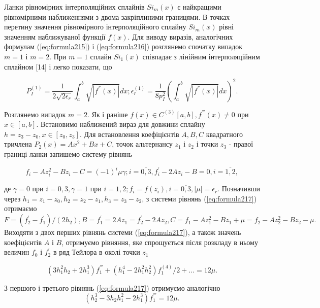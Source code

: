 \documentclass[ukrainian,14pt]{extarticle}
\begin{document}
Ланки рівномірних інтерполяційних сплайнів $Si_m(x)$ є найкращими рівномірними наближеннями з двома закріплиними границями. В точках перетину значення рівномірного інтерполяційного сплайну $Si_m(x)$ рівні значенням наближуваної функції $f(x)$. Для виводу виразів, аналогічних формулам (\ref{eq:formula215}) і (\ref{eq:formula216}) розглянемо спочатку випадок $m = 1$ і $m = 2$. При $m = 1$ сплайн $Si_1(x)$ співпадає з лінійним інтерполяційним сплайном [14] і легко показати, що

$$P^{(1)}_I = \frac{1}{2\sqrt{2\epsilon_r}} \int_a^b \sqrt{|f^{''}(x)|}dx; \epsilon^{(1)}_r = \frac{1}{8p_{I}^2} \left(\int_a^b \sqrt{|f^{''}(x)|}dx \right)^2.$$

Розглянемо випадок $m = 2$. Як і раніше $f(x) \in C^{(3)} [a, b], f^{'''}(x) \neq 0$ при $x \in [a, b]$. Встановимо наближений вираз для довжини сплайну $h  = z_3 - z_0, x \in [z_0, z_3].$ Для встановлення коефіцієнтів $A, B, C$ квадратного тричлена $P_2(x) = Ax^2 + Bx + C$, точок альтернансу $z_1$ і $z_2$ і точки $z_3$ - правої границі ланки запишемо систему рівнянь

\begin{equation}\label{eq:formula217}
    f_i - Az_i^2 - Bz_i - C = (-1)^i \mu \gamma; i = \overline{0, 3}, f^'_i - 2Az_i - B = 0, i = \overline{1,2},
\end{equation}

де $\gamma = 0$ при $i = 0, 3, \gamma = 1$ при $i = 1,2; f_i = f(z_i), i = \overline{0, 3}, |\mu| = \epsilon_r$. Позначивши через $h_1 = z_1 - z_0, h_2 = z_2 - z_1, h_3 = z_3 - z_2$, з системи рівнянь (\ref{eq:formula217}) отримаємо
$$F = (f^{'}_2 - f^{'}_1) / (2h_2), B = f^'_1 = 2Az_1 = f^'_2 - 2Az_2, C = f_1 - Az_1^2 - Bz_1 + \mu = f_2 - Az_2^2 - Bz_2 - \mu.$$
Виходяти з двох перших рівнянь системи (\ref{eq:formula217}), а також значень коефіцієнтів $A$ і $B$, отримуємо рівняння, яке спрощується після розкладу в ньому величин $f_0$ і $f^'_2$ в ряд Тейлора в околі точки $z_1$

\begin{equation}\label{eq:formula218}
  (3h_1^2 h_2 + 2h_1^3)f^{'''}_1 + (h_1^4 - 2h_1^2 h_2^2) f^{(4)}_1 / 2 + \ldots = 12 \mu.  
\end{equation}

З першого і третього рівнянь (\ref{eq:formula217}) отримуємо аналогічно
\begin{equation}\label{eq:formula219}
 (h_2^3 - 3h_2h_1^2 - 2h_1^3)f^{'''}_1 = 12\mu.
\end{equation}
\end{document}
